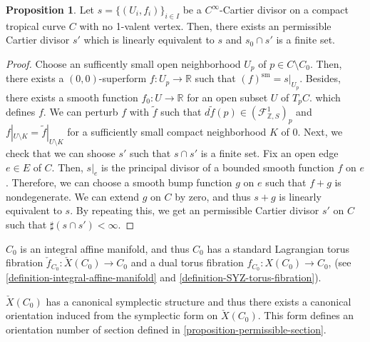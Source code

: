 \documentclass[a4paper,dvipdfmx,reqno,12pt]{amsart}
\theoremstyle{definition}
\newtheorem{proposition}[theorem]{Proposition}
\numberwithin{equation}{section}
\begin{document}
\begin{proposition}
Let $s=\{(U_i,f_i)\}_{i\in I}$ be a $C^{\infty}$-Cartier divisor on a compact
tropical curve $C$ with no 1-valent vertex.
Then, there exists
an permissible Cartier divisor $s'$ which is linearly
equivalent to $s$ and
$s_0\cap s'$ is a finite set. 
\end{proposition}
\begin{proof}

Choose an sufficently small open neighborhood 
$U_p$ of $p\in C\setminus C_0$. Then, there exists a 
$(0,0)$-superform $f\colon U_p \to \mathbb{R}$ such 
that $(f)^{\mathrm{sm}}=s|_{U_p}$. Besides, there exists 
a smooth function $f_0\colon U\to \mathbb{R}$ for 
an open subset $U$ of $T_p C$.  
which defines $f$. We can perturb $f$ with 
$\tilde{f}$ such that 
$d\tilde{f}(p)\in (\mathcal{F}_{\mathbb{Z},S}^{1})_p$
and $f|_{U\setminus K}=\tilde{f}|_{U\setminus K}$ for 
a sufficiently small compact neighborhood $K$ of $0$.  
Next, we check that we can shoose $s'$ 
such that $s\cap s'$ is a finite set.
Fix an open edge $e \in E$ of $C$.
Then, $s|_e$ is the principal divisor of a bounded smooth 
function $f$ on $e$. 
Therefore, we can choose a smooth bump function $g$ on $e$ such 
that $f+g$ is nondegenerate. We can extend $g$ on $C$ 
by zero, and thus $s+g$ is linearly equivalent to $s$.
By repeating this, we get an permissible Cartier divisor
$s'$ on $C$ such that $\sharp (s\cap s')<\infty$.
\end{proof}



$C_0$ is an integral affine manifold, 
and thus $C_0$ has a standard Lagrangian torus fibration
$\check{f}_{C_0}\colon \check{X}(C_0)\to C_0$ and
a dual torus fibration 
$f_{C_0}\colon X(C_0)\to C_0$,
(see \cref{definition-integral-affine-manifold}
and \cref{definition-SYZ-torus-fibration}).

$\check{X}(C_0)$ has a canonical symplectic structure
and thus there exists a canonical orientation induced
from the symplectic form on $\check{X}(C_0)$.
This form defines an orientation number of 
section defined in \cref{proposition-permissible-section}.

\end{document}

